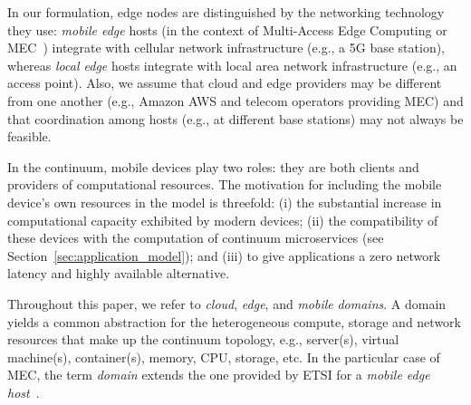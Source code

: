 %
%

In our formulation, edge nodes are distinguished by the networking technology they use: \textit{mobile edge} hosts (in the context of Multi-Access Edge Computing or MEC~\cite{etsimec16,ahmed2016isco}) integrate with cellular network infrastructure (e.g., a 5G base station), whereas \textit{local edge} hosts integrate with local area network infrastructure (e.g., an access point). Also, we assume that cloud and edge providers may be different from one another (e.g., Amazon AWS and telecom operators providing MEC) and that coordination among hosts (e.g., at different base stations) may not always be feasible.




In the continuum, mobile devices play two roles: they are both clients and providers of computational resources. The motivation for including the mobile device's own resources in the model is threefold: (i) the substantial increase in computational capacity exhibited by modern devices; (ii) the compatibility of these devices with the computation of continuum microservices (see Section~\ref{sec:application_model}); and (iii) to give applications a zero network latency and highly available alternative.%


Throughout this paper, we refer to \textit{cloud}, \textit{edge}, and \textit{mobile} \textit{domains}. 
A domain yields a common  abstraction for the heterogeneous compute, storage and network resources that make up the continuum topology, e.g., server(s), virtual machine(s), container(s), memory, CPU, storage, etc. In the particular case of MEC, the term \textit{domain} extends the one provided by ETSI for a \textit{mobile edge host}~\cite{etsimec16}.



